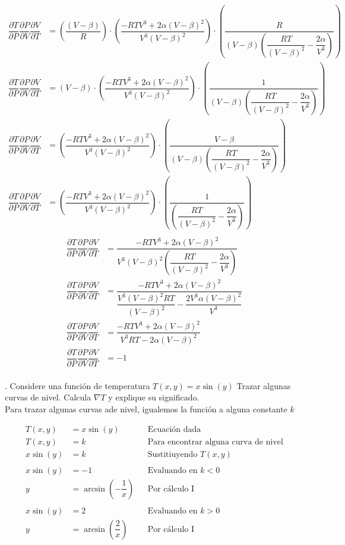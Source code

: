 \documentclass[letterpaper]{article}
\renewcommand{\d}{\partial}
\renewcommand{\*}{\cdot}
\theoremstyle{definition}
\begin{document}
\begin{align*}
	\dfrac{\d T}{\d P}\dfrac{\d P}{\d V}\dfrac{\d V}{\d T} &= \left( \dfrac{(V - \beta)}{R}\right)\* \left(\dfrac{-RTV^3 + 2\alpha(V - \beta)^2}{V^3(V-\beta)^2}\right)\* \left(\dfrac{R}{(V - \beta)\left(\dfrac{RT}{(V - \beta)^2} - \dfrac{2\alpha}{V^3}\right) }\right)\\
	\dfrac{\d T}{\d P}\dfrac{\d P}{\d V}\dfrac{\d V}{\d T}&= \left(V - \beta \right)\* \left(\dfrac{-RTV^3 + 2\alpha(V - \beta)^2}{V^3(V-\beta)^2}\right)\* \left(\dfrac{1}{(V - \beta)\left(\dfrac{RT}{(V - \beta)^2} - \dfrac{2\alpha}{V^3}\right) }\right)\\
	\dfrac{\d T}{\d P}\dfrac{\d P}{\d V}\dfrac{\d V}{\d T} &= \left(\dfrac{-RTV^3 + 2\alpha(V - \beta)^2}{V^3(V-\beta)^2} \right)\* \left(\dfrac{V - \beta }{(V - \beta)\left(\dfrac{RT}{(V - \beta)^2} - \dfrac{2\alpha}{V^3}\right) }\right)\\
	\dfrac{\d T}{\d P}\dfrac{\d P}{\d V}\dfrac{\d V}{\d T} &= \left(\dfrac{-RTV^3 + 2\alpha(V - \beta)^2}{V^3(V-\beta)^2} \right)\* \left(\dfrac{1}{\left(\dfrac{RT}{(V - \beta)^2} - \dfrac{2\alpha}{V^3}\right) }\right)\\ %
\end{align*}
\begin{align*}
	\dfrac{\d T}{\d P}\dfrac{\d P}{\d V}\dfrac{\d V}{\d T} &=  \dfrac{-RTV^3 + 2\alpha(V - \beta)^2 }{ V^3(V-\beta)^2 \left( \dfrac{RT}{(V - \beta)^2} - \dfrac{ 2\alpha }{ V^3 } \right) }\\
	\dfrac{\d T}{\d P}\dfrac{\d P}{\d V}\dfrac{\d V}{\d T} &=  \dfrac{-RTV^3 + 2\alpha(V - \beta)^2 }{ \dfrac{V^3(V - \beta)^2 RT }{(V - \beta)^2} - \dfrac{2V^3 \alpha(V - \beta)^2 }{V^3}}\\
	\dfrac{\d T}{\d P}\dfrac{\d P}{\d V}\dfrac{\d V}{\d T} &=  \dfrac{-RTV^3 + 2\alpha(V - \beta)^2 }{ V^3RT - 2\alpha(V - \beta)^2 }\\
	\dfrac{\d T}{\d P}\dfrac{\d P}{\d V}\dfrac{\d V}{\d T} &= -1\\
\end{align*}

. Considere una función de temperatura $ T(x,y) = x\sin(y) $ Trazar algunas curvas de nivel. Calcula $ \nabla T $ y explique su significado.\\

Para trazar algunas curvas ade nivel, igualemos la función a alguna constante $ k $

\begin{align*}
	T(x,y) &= x\sin(y) &&\text{Ecuación dada}\\
	T(x,y) &= k &&\text{Para encontrar alguna curva de nivel}\\
	x\sin(y) &= k &&\text{Sustitiuyendo }T(x,y)\\
	\\
	x\sin(y) &= -1 &&\text{Evaluando en  }k < 0\\
	y &= \arcsin\left(-\dfrac{1}{x}\right) &&\text{Por cálculo I }\\
	\\
	x\sin(y) &= 2 &&\text{Evaluando en  }k > 0\\
	y &= \arcsin\left(\dfrac{2}{x}\right)&&\text{Por cálculo I }\\	
\end{align*}
\end{document}
